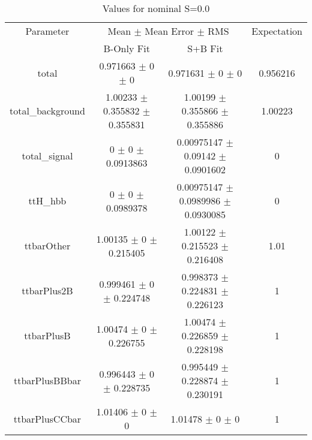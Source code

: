 \begin{table}
\centering
\caption{Values for nominal S=0.0}
\begin{tabular}{cccc}
\toprule
Parameter & \multicolumn{2}{c}{Mean $\pm$ Mean Error $\pm$ RMS} & Expectation\\
 & B-Only Fit & S+B Fit & \\
\midrule
total & \num{0.971663} $\pm$ \num{0} $\pm$ \num{0} & \num{0.971631} $\pm$ \num{0} $\pm$ \num{0} & \num{0.956216}\\
total\_background & \num{1.00233} $\pm$ \num{0.355832} $\pm$ \num{0.355831} & \num{1.00199} $\pm$ \num{0.355866} $\pm$ \num{0.355886} & \num{1.00223}\\
total\_signal & \num{0} $\pm$ \num{0} $\pm$ \num{0.0913863} & \num{0.00975147} $\pm$ \num{0.09142} $\pm$ \num{0.0901602} & \num{0}\\
ttH\_hbb & \num{0} $\pm$ \num{0} $\pm$ \num{0.0989378} & \num{0.00975147} $\pm$ \num{0.0989986} $\pm$ \num{0.0930085} & \num{0}\\
ttbarOther & \num{1.00135} $\pm$ \num{0} $\pm$ \num{0.215405} & \num{1.00122} $\pm$ \num{0.215523} $\pm$ \num{0.216408} & \num{1.01}\\
ttbarPlus2B & \num{0.999461} $\pm$ \num{0} $\pm$ \num{0.224748} & \num{0.998373} $\pm$ \num{0.224831} $\pm$ \num{0.226123} & \num{1}\\
ttbarPlusB & \num{1.00474} $\pm$ \num{0} $\pm$ \num{0.226755} & \num{1.00474} $\pm$ \num{0.226859} $\pm$ \num{0.228198} & \num{1}\\
ttbarPlusBBbar & \num{0.996443} $\pm$ \num{0} $\pm$ \num{0.228735} & \num{0.995449} $\pm$ \num{0.228874} $\pm$ \num{0.230191} & \num{1}\\
ttbarPlusCCbar & \num{1.01406} $\pm$ \num{0} $\pm$ \num{0} & \num{1.01478} $\pm$ \num{0} $\pm$ \num{0} & \num{1}\\
\bottomrule
\end{tabular}
\end{table}
